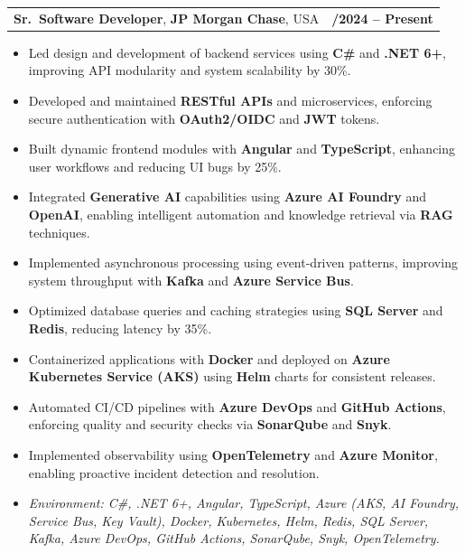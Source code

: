 \documentclass[letterpaper,11pt]{article}
\makeatletter
\newcommand{\resumeItem}[1]{
  \item\footnotesize{
    {#1 \vspace{-2pt}}
  }
}
\newcommand{\resumeSubheading}[4]{
  \vspace{-2pt}\item
    \begin{tabular*}{1.0\textwidth}[t]{l@{\extracolsep{\fill}}r}
      \textbf{\fontsize{10pt}{14pt}\selectfont #3}, \textbf{\fontsize{10pt}{14pt}\selectfont #1}, \fontsize{10pt}{14pt}\selectfont #4 & \textbf{\fontsize{10pt}{14pt}\selectfont #2} \\
    \end{tabular*}\vspace{-7pt}
}
\newcommand{\resumeItemListStart}{\begin{itemize}[leftmargin=*]}
\newcommand{\resumeItemListEnd}{\end{itemize}\vspace{-5pt}}
\makeatother
\begin{document}
\resumeSubheading
{JP Morgan Chase}{09/2024 -- Present}
{Sr.\ Software Developer}{USA}
\resumeItemListStart
  \resumeItem{Led design and development of backend services using \textbf{C\#} and \textbf{.NET 6+}, improving API modularity and system scalability by 30\%.}
  \resumeItem{Developed and maintained \textbf{RESTful APIs} and microservices, enforcing secure authentication with \textbf{OAuth2/OIDC} and \textbf{JWT} tokens.}
  \resumeItem{Built dynamic frontend modules with \textbf{Angular} and \textbf{TypeScript}, enhancing user workflows and reducing UI bugs by 25\%.}
  \resumeItem{Integrated \textbf{Generative AI} capabilities using \textbf{Azure AI Foundry} and \textbf{OpenAI}, enabling intelligent automation and knowledge retrieval via \textbf{RAG} techniques.}
  \resumeItem{Implemented asynchronous processing using event-driven patterns, improving system throughput with \textbf{Kafka} and \textbf{Azure Service Bus}.}
  \resumeItem{Optimized database queries and caching strategies using \textbf{SQL Server} and \textbf{Redis}, reducing latency by 35\%.}
  \resumeItem{Containerized applications with \textbf{Docker} and deployed on \textbf{Azure Kubernetes Service (AKS)} using \textbf{Helm} charts for consistent releases.}
  \resumeItem{Automated CI/CD pipelines with \textbf{Azure DevOps} and \textbf{GitHub Actions}, enforcing quality and security checks via \textbf{SonarQube} and \textbf{Snyk}.}
  \resumeItem{Implemented observability using \textbf{OpenTelemetry} and \textbf{Azure Monitor}, enabling proactive incident detection and resolution.}
  \resumeItem{\textit{Environment: C\#, .NET 6+, Angular, TypeScript, Azure (AKS, AI Foundry, Service Bus, Key Vault), Docker, Kubernetes, Helm, Redis, SQL Server, Kafka, Azure DevOps, GitHub Actions, SonarQube, Snyk, OpenTelemetry.}}
\resumeItemListEnd
\end{document}
